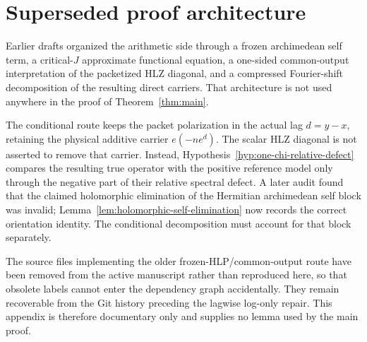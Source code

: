 \section{Superseded proof architecture}
\label{sec:legacy-route-note}

Earlier drafts organized the arithmetic side through a frozen archimedean self
term, a critical-$J$ approximate functional equation, a one-sided
common-output interpretation of the packetized HLZ diagonal, and a compressed
Fourier-shift decomposition of the resulting direct carriers.  That
architecture is not used anywhere in the proof of
Theorem~\ref{thm:main}.

The conditional route keeps the packet polarization in the actual lag
$d=y-x$, retaining the physical additive carrier $e(-ne^d)$.  The scalar HLZ
diagonal is not asserted to remove that carrier.  Instead,
Hypothesis~\ref{hyp:one-chi-relative-defect} compares the resulting true
operator with the positive reference model only through the negative part of
their relative spectral defect. A later audit found that the claimed
holomorphic elimination of the Hermitian archimedean self block was invalid;
Lemma~\ref{lem:holomorphic-self-elimination} now records the correct
orientation identity. The conditional decomposition must account for that
block separately.

The source files implementing the older frozen-HLP/common-output route have
been removed from the active manuscript rather than reproduced here, so that
obsolete labels cannot enter the dependency graph accidentally.  They remain
recoverable from the Git history preceding the lagwise log-only repair.  This
appendix is therefore documentary only and supplies no lemma used by the main
proof.
